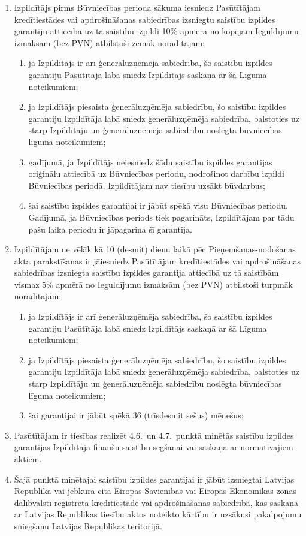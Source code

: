 \begin{multicols}{2}
\begin{enumerate}
	\item Izpildītājs pirms Būvniecības perioda sākuma iesniedz Pasūtītājam kredītiestādes vai apdrošināšanas sabiedrības izsniegtu saistību izpildes garantiju attiecībā uz tā saistību izpildi 10\% apmērā no kopējām Ieguldījumu izmaksām (bez PVN) atbilstoši zemāk norādītajam:
	\begin{enumerate}
		\item ja Izpildītājs ir arī ģenerāluzņēmēja sabiedrība, šo saistību izpildes garantiju Pasūtītāja labā sniedz Izpildītājs saskaņā ar šā Līguma noteikumiem;
		\item ja Izpildītājs piesaista ģenerāluzņēmēja sabiedrību, šo saistību izpildes garantiju Izpildītāja labā sniedz ģenerāluzņēmēja sabiedrība, balstoties uz starp Izpildītāju un ģenerāluzņēmēja sabiedrību noslēgta būvniecības līguma noteikumiem;
		\item gadījumā, ja Izpildītājs neiesniedz šādu saistību izpildes garantijas oriģinālu attiecībā uz Būvniecības periodu, nodrošinot darbību izpildi Būvniecības periodā, Izpildītājam nav tiesību uzsākt būvdarbus;
		\item šai saistību izpildes garantijai ir jābūt spēkā visu Būvniecības periodu. Gadījumā, ja Būvniecības periods tiek pagarināts, Izpildītājam par tādu pašu laika periodu ir jāpagarina šī garantija.
	\end{enumerate}
	\item Izpildītājam ne vēlāk kā 10 (desmit) dienu laikā pēc Pieņemšanas-nodošanas akta parakstīšanas ir jāiesniedz Pasūtītājam kredītiestādes vai apdrošināšanas sabiedrības izsniegta saistību izpildes garantija attiecībā uz tā saistībām vismaz 5\% apmērā no Ieguldījumu izmaksām (bez PVN) atbilstoši turpmāk norādītajam:

	\begin{enumerate}
		\item ja Izpildītājs ir arī ģenerāluzņēmēja sabiedrība, šo saistību izpildes garantiju Pasūtītāja labā sniedz Izpildītājs saskaņā ar šā Līguma noteikumiem;
		\item ja Izpildītājs piesaista ģenerāluzņēmēja sabiedrību, šo saistību izpildes garantiju Izpildītāja labā sniedz ģenerāluzņēmēja sabiedrība, balstoties uz starp Izpildītāju un ģenerāluzņēmēja sabiedrību noslēgta būvniecības līguma noteikumiem;
		\item šai garantijai ir jābūt spēkā 36 (trīsdesmit sešus) mēnešus;
	\end{enumerate}
	\item Pasūtītājam ir tiesības realizēt 4.6.\ un 4.7.\ punktā minētās saistību izpildes garantijas Izpildītāja finanšu saistību segšanai vai saskaņā ar normatīvajiem aktiem.
	\item Šajā punktā minētajai saistību izpildes garantijai ir jābūt izsniegtai Latvijas Republikā vai jebkurā citā Eiropas Savienības vai Eiropas Ekonomikas zonas dalībvalstī reģistrētā kredītiestādē vai apdrošināšanas sabiedrībā, kas saskaņā ar Latvijas Republikas tiesību aktos noteikto kārtību ir uzsākusi pakalpojumu sniegšanu Latvijas Republikas teritorijā.
\end{enumerate}


\end{multicols}
